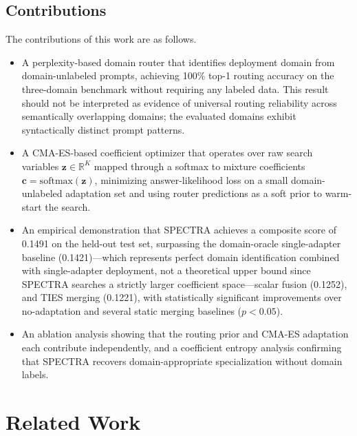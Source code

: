 \documentclass[preprint,12pt]{elsarticle}
\begin{document}
\subsection{Contributions}

The contributions of this work are as follows.

\begin{itemize}
    \item A perplexity-based domain router that identifies deployment domain
    from domain-unlabeled prompts, achieving 100\% top-1 routing accuracy
    on the three-domain benchmark without requiring any labeled data. This
    result should not be interpreted as evidence of universal routing
    reliability across semantically overlapping domains; the evaluated domains
    exhibit syntactically distinct prompt patterns.

    \item A CMA-ES-based coefficient optimizer that operates over raw search
    variables $\mathbf{z} \in \mathbb{R}^K$ mapped through a softmax to
    mixture coefficients $\mathbf{c} = \mathrm{softmax}(\mathbf{z})$,
    minimizing answer-likelihood loss on a small domain-unlabeled adaptation
    set and using router predictions as a soft prior to warm-start the search.

    \item An empirical demonstration that SPECTRA achieves a composite score of
    0.1491 on the held-out test set, surpassing the domain-oracle single-adapter
    baseline (0.1421)---which represents perfect domain identification combined
    with single-adapter deployment, not a theoretical upper bound since SPECTRA
    searches a strictly larger coefficient space---scalar fusion (0.1252), and
    TIES merging (0.1221), with statistically significant improvements over
    no-adaptation and several static merging baselines ($p < 0.05$).

    \item An ablation analysis showing that the routing prior and CMA-ES
    adaptation each contribute independently, and a coefficient entropy analysis
    confirming that SPECTRA recovers domain-appropriate specialization without
    domain labels.
\end{itemize}

\section{Related Work}
\label{sec:related}
\end{document}
